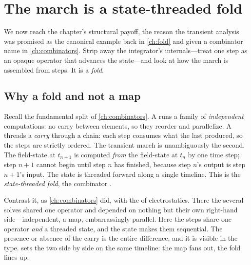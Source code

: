 \section{The march is a state-threaded fold}
\label{sec:fold-march}

We now reach the chapter's structural payoff, the reason the transient analysis was
promised as the canonical example back in \cref{ch:fold} and given a combinator
name in \cref{ch:combinators}. Strip away the integrator's internals---treat one
step as an opaque operator  that advances the state---and look
at how the march is assembled from steps. It is a \emph{fold}.

\subsection{Why a fold and not a map}

Recall the fundamental split of \cref{ch:combinators}. A  runs a family
of \emph{independent} computations: no carry between elements, so they reorder and
parallelize. A  threads a \emph{carry} through a chain: each step
consumes what the last produced, so the steps are strictly ordered. The transient
march is unambiguously the second. The field-state at $t_{n+1}$ is computed
\emph{from} the field-state at $t_n$ by one time step; step $n+1$ cannot begin
until step $n$ has finished, because step $n$'s output is step $n+1$'s input. The
state is threaded forward along a single timeline. This is the
\emph{state-threaded fold}, the combinator .

Contrast it, as \cref{ch:combinators} did, with the  of
electrostatics. There the several solves shared one operator and depended on
nothing but their own right-hand side---independent, a map, embarrassingly
parallel. Here the steps share one operator \emph{and} a threaded state, and the
state makes them sequential. The presence or absence of the carry is the entire
difference, and it is visible in the type.  sets the two side
by side on the same timeline: the map fans out, the fold lines up.

